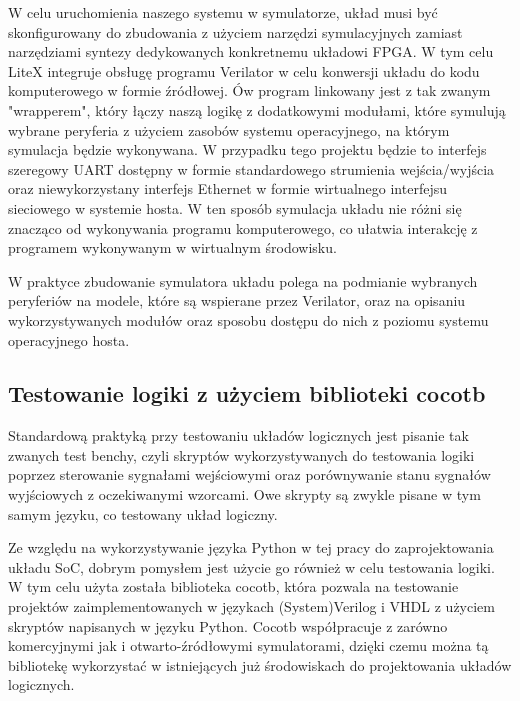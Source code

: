 W celu uruchomienia naszego systemu w symulatorze, układ musi być skonfigurowany do zbudowania z użyciem narzędzi symulacyjnych zamiast narzędziami syntezy dedykowanych konkretnemu układowi FPGA. W tym celu LiteX integruje obsługę programu Verilator w celu konwersji układu do kodu komputerowego w formie źródłowej. Ów program linkowany jest z tak zwanym "wrapperem", który łączy naszą logikę z dodatkowymi modułami, które symulują wybrane peryferia z użyciem zasobów systemu operacyjnego, na którym symulacja będzie wykonywana. W przypadku tego projektu będzie to interfejs szeregowy UART dostępny w formie standardowego strumienia wejścia/wyjścia oraz niewykorzystany interfejs Ethernet w formie wirtualnego interfejsu sieciowego w systemie hosta. W ten sposób symulacja układu nie różni się znacząco od wykonywania programu komputerowego, co ułatwia interakcję z programem wykonywanym w wirtualnym środowisku.


W praktyce zbudowanie symulatora układu polega na podmianie wybranych peryferiów na modele, które są wspierane przez Verilator, oraz na opisaniu wykorzystywanych modułów oraz sposobu dostępu do nich z poziomu systemu operacyjnego hosta.


\subsection{Testowanie logiki z użyciem biblioteki cocotb}
Standardową praktyką przy testowaniu układów logicznych jest pisanie tak zwanych test benchy, czyli skryptów wykorzystywanych do testowania logiki poprzez sterowanie sygnałami wejściowymi oraz porównywanie stanu sygnałów wyjściowych z oczekiwanymi wzorcami. Owe skrypty są zwykle pisane w tym samym języku, co testowany układ logiczny.

Ze względu na wykorzystywanie języka Python w tej pracy do zaprojektowania układu SoC, dobrym pomysłem jest użycie go również w celu testowania logiki. W tym celu użyta została biblioteka cocotb, która pozwala na testowanie projektów zaimplementowanych w językach (System)Verilog i VHDL z użyciem skryptów napisanych w języku Python. Cocotb współpracuje z zarówno komercyjnymi jak i otwarto-źródłowymi symulatorami, dzięki czemu można tą bibliotekę wykorzystać w istniejących już środowiskach do projektowania układów logicznych.

